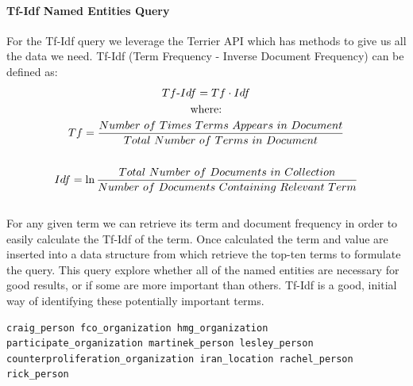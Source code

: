 \documentclass{l4proj}
\newenvironment{codelisting}{\captionsetup{type=listing}}{}
\begin{document}
\paragraph{Tf-Idf Named Entities Query} \label{tfidfquery}
For the Tf-Idf query we leverage the Terrier API which has methods to give us all the data we need.
Tf-Idf (Term Frequency - Inverse Document Frequency) can be defined as:
\begin{gather*}
Tf\textnormal{-}Idf = Tf \cdot Idf \\
\textnormal{where:} \\ 
Tf = \frac{Number\ of\ Times\ Terms\ Appears\ in\ Document}{Total\ Number\ of\ Terms\ in\ Document} \\ \\
Idf = \ln{\frac{Total\ Number\ of\ Documents\ in\ Collection}{Number\ of\ Documents\ Containing\ Relevant\ Term}}
\end{gather*}
\hfill \cite{Manning:2008:IIR:1394399}\\
For any given term we can retrieve its term and document frequency in order to easily calculate the Tf-Idf of the term. Once calculated the term and value are inserted into a data structure from which retrieve the top-ten terms to formulate the query. This query explore whether all of the named entities are necessary for good results, or if some are more important than others. Tf-Idf is a good, initial way of identifying these potentially important terms.\\
\begin{codelisting}
\begin{verbatim}
craig_person fco_organization hmg_organization participate_organization martinek_person lesley_person counterproliferation_organization iran_location rachel_person rick_person
\end{verbatim}
\label{code:tf_idf_query}
\end{codelisting}
\end{document}
